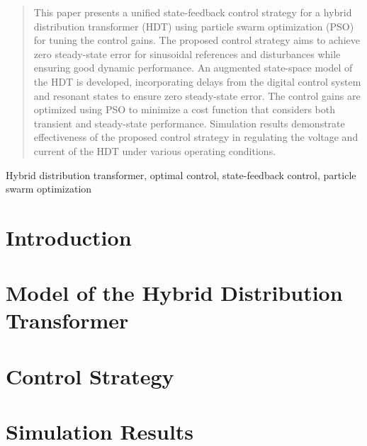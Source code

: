 





\maketitle

\begin{abstract}
    This paper presents a unified state-feedback control strategy for a hybrid distribution transformer (HDT) using particle swarm optimization (PSO) for tuning the control gains. The proposed control strategy aims to achieve zero steady-state error for sinusoidal references and disturbances while ensuring good dynamic performance. An augmented state-space model of the HDT is developed, incorporating delays from the digital control system and resonant states to ensure zero steady-state error. The control gains are optimized using PSO to minimize a cost function that considers both transient and steady-state performance. Simulation results demonstrate effectiveness of the proposed control strategy in regulating the voltage and current of the HDT under various operating conditions.
\end{abstract}

\begin{IEEEkeywords}
    Hybrid distribution transformer, optimal control, state-feedback control, particle swarm optimization
\end{IEEEkeywords}

\section{Introduction}



\section{Model of the Hybrid Distribution Transformer}



\section{Control Strategy}



\section{Simulation Results}

